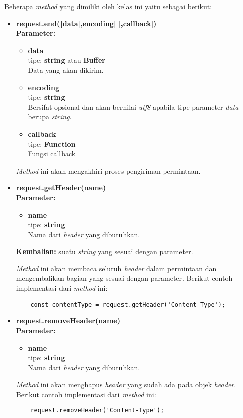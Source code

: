 \begin{enumerate}
	Beberapa \textit{method} yang dimiliki oleh kelas ini yaitu sebagai berikut:
		\begin{itemize}
			\item \textbf{request.end([data[,encoding]][,callback])} \\ 
			\textbf{Parameter:} 
			\begin{itemize}
				\item \textbf{data} \\tipe: \textbf{string} atau \textbf{Buffer} \\ Data yang akan dikirim.
				\item \textbf{encoding} \\tipe: \textbf{string} \\ Bersifat opsional dan akan bernilai \textit{utf8} apabila tipe parameter \textit{data} berupa \textit{string}.
				\item \textbf{callback} \\tipe:	\textbf{Function} \\ Fungsi callback
			\end{itemize}
		
			\textit{Method} ini akan mengakhiri proses pengiriman permintaan.
			
			\item \textbf{request.getHeader(name)} \\
			\textbf{Parameter:} 
			\begin{itemize}
				\item \textbf{name} \\tipe: \textbf{string} \\ Nama dari \textit{header} yang dibutuhkan.
			\end{itemize}
			\textbf{Kembalian:} suatu \textit{string} yang sesuai dengan parameter.
			
			\textit{Method} ini akan membaca seluruh \textit{header} dalam permintaan dan mengembalikan bagian yang sesuai dengan parameter. Berikut contoh implementasi dari \textit{method} ini:
	\begin{lstlisting}
	const contentType = request.getHeader('Content-Type');
	\end{lstlisting}
			
			\item \textbf{request.removeHeader(name)} \\ 
			\textbf{Parameter:}
			\begin{itemize}
				\item \textbf{name} \\tipe: \textbf{string} \\ Nama dari \textit{header} yang dibutuhkan.
			\end{itemize}
			\textit{Method} ini akan menghapus \textit{header} yang sudah ada pada objek \textit{header}. Berikut contoh implementasi dari \textit{method} ini:
	\begin{lstlisting}
	request.removeHeader('Content-Type');
	\end{lstlisting}
	

\end{itemize}
\end{enumerate}

